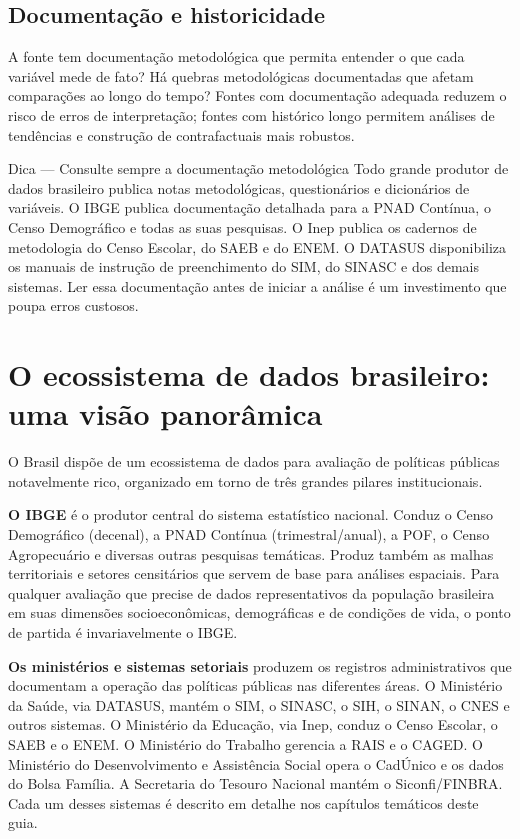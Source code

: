 \subsection{Documentação e historicidade}

A fonte tem documentação metodológica que permita entender o que cada variável mede de fato? Há quebras metodológicas documentadas que afetam comparações ao longo do tempo? Fontes com documentação adequada reduzem o risco de erros de interpretação; fontes com histórico longo permitem análises de tendências e construção de contrafactuais mais robustos.

\begin{boxdica}{Dica — Consulte sempre a documentação metodológica}
Todo grande produtor de dados brasileiro publica notas metodológicas, questionários e dicionários de variáveis. O IBGE publica documentação detalhada para a PNAD Contínua, o Censo Demográfico e todas as suas pesquisas. O Inep publica os cadernos de metodologia do Censo Escolar, do SAEB e do ENEM. O DATASUS disponibiliza os manuais de instrução de preenchimento do SIM, do SINASC e dos demais sistemas. Ler essa documentação antes de iniciar a análise é um investimento que poupa erros custosos.
\end{boxdica}

\section{O ecossistema de dados brasileiro: uma visão panorâmica}

O Brasil dispõe de um ecossistema de dados para avaliação de políticas públicas notavelmente rico, organizado em torno de três grandes pilares institucionais.

\textbf{O IBGE} é o produtor central do sistema estatístico nacional. Conduz o Censo Demográfico (decenal), a PNAD Contínua (trimestral/anual), a POF, o Censo Agropecuário e diversas outras pesquisas temáticas. Produz também as malhas territoriais e setores censitários que servem de base para análises espaciais. Para qualquer avaliação que precise de dados representativos da população brasileira em suas dimensões socioeconômicas, demográficas e de condições de vida, o ponto de partida é invariavelmente o IBGE.

\textbf{Os ministérios e sistemas setoriais} produzem os registros administrativos que documentam a operação das políticas públicas nas diferentes áreas. O Ministério da Saúde, via DATASUS, mantém o SIM, o SINASC, o SIH, o SINAN, o CNES e outros sistemas. O Ministério da Educação, via Inep, conduz o Censo Escolar, o SAEB e o ENEM. O Ministério do Trabalho gerencia a RAIS e o CAGED. O Ministério do Desenvolvimento e Assistência Social opera o CadÚnico e os dados do Bolsa Família. A Secretaria do Tesouro Nacional mantém o Siconfi/FINBRA. Cada um desses sistemas é descrito em detalhe nos capítulos temáticos deste guia.


